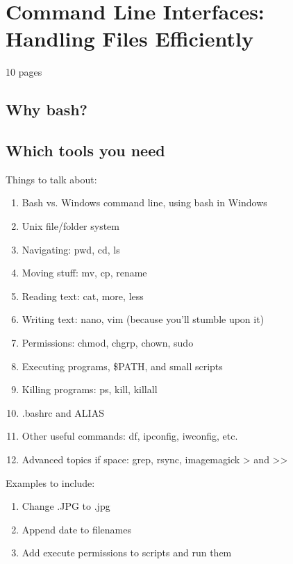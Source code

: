 \chapter{Command Line Interfaces: Handling Files Efficiently}
10 pages
\section{Why bash?}
\section{Which tools you need}

Things to talk about:
\begin{enumerate}
	\item Bash vs. Windows command line, using bash in Windows
	\item Unix file/folder system
	\item Navigating: pwd, cd, ls
	\item Moving stuff: mv, cp, rename
	\item Reading text: cat, more, less
	\item Writing text: nano, vim (because you'll stumble upon it)
	\item Permissions: chmod, chgrp, chown, sudo
	\item Executing programs, \$PATH, and small scripts
	\item Killing programs: ps, kill, killall
	\item .bashrc and ALIAS
	\item Other useful commands: df, ipconfig, iwconfig, etc.
	\item Advanced topics if space: grep, rsync, imagemagick > and >>
\end{enumerate}

Examples to include:
\begin{enumerate}
	\item Change .JPG to .jpg
	\item Append date to filenames
	\item Add execute permissions to scripts and run them
\end{enumerate}
